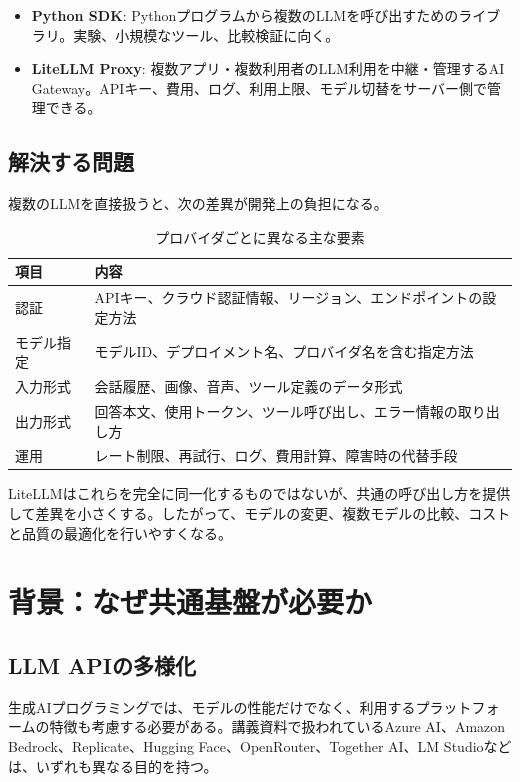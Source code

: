 \documentclass[a4paper,11pt]{jsarticle}
\begin{document}
\begin{itemize}
  \item \textbf{Python SDK}: Pythonプログラムから複数のLLMを呼び出すためのライブラリ。実験、小規模なツール、比較検証に向く。
  \item \textbf{LiteLLM Proxy}: 複数アプリ・複数利用者のLLM利用を中継・管理するAI Gateway。APIキー、費用、ログ、利用上限、モデル切替をサーバー側で管理できる。
\end{itemize}

\subsection{解決する問題}

複数のLLMを直接扱うと、次の差異が開発上の負担になる。

\begin{table}[tbp]
\centering
\caption{プロバイダごとに異なる主な要素}
\begin{tabular}{p{38mm}p{105mm}}
\toprule
項目 & 内容 \\
\midrule
認証 & APIキー、クラウド認証情報、リージョン、エンドポイントの設定方法 \\
モデル指定 & モデルID、デプロイメント名、プロバイダ名を含む指定方法 \\
入力形式 & 会話履歴、画像、音声、ツール定義のデータ形式 \\
出力形式 & 回答本文、使用トークン、ツール呼び出し、エラー情報の取り出し方 \\
運用 & レート制限、再試行、ログ、費用計算、障害時の代替手段 \\
\bottomrule
\end{tabular}
\end{table}

LiteLLMはこれらを完全に同一化するものではないが、共通の呼び出し方を提供して差異を小さくする。したがって、モデルの変更、複数モデルの比較、コストと品質の最適化を行いやすくなる。

\section{背景：なぜ共通基盤が必要か}

\subsection{LLM APIの多様化}

生成AIプログラミングでは、モデルの性能だけでなく、利用するプラットフォームの特徴も考慮する必要がある。講義資料で扱われているAzure AI、Amazon Bedrock、Replicate、Hugging Face、OpenRouter、Together AI、LM Studioなどは、いずれも異なる目的を持つ。
\end{document}
